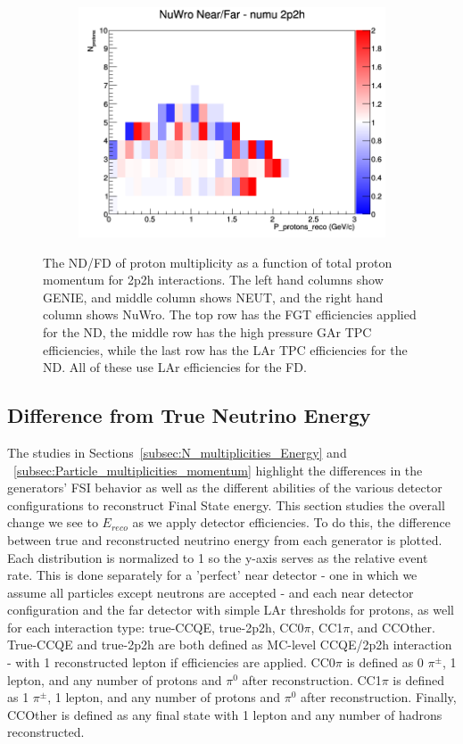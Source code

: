 \documentclass[12pt]{article}
\begin{document}
\begin{figure}[h]
\begin{subfigure}[b]{0.32\textwidth}
\includegraphics[width=\linewidth]{eff_N_P/LAr/protons/ratios/2p2h_NuWro_numu_NF_N_P.png}
\end{subfigure}
\caption{The ND/FD of proton multiplicity as a function of total proton momentum for 2p2h interactions. The left hand columns show GENIE, and middle column shows NEUT, and the right hand column shows NuWro. The top row has the FGT efficiencies applied for the ND, the middle row has the high pressure GAr TPC efficiencies, while the last row has the LAr TPC efficiencies for the ND.  All of these use LAr efficiencies for the FD.}
\label{fig:proton_multiplicity_2p2h_NF_eff}
\end{figure}



\subsection{Difference from True Neutrino Energy}
\label{subsec:EDiff}
The studies in Sections~\ref{subsec:N_multiplicities_Energy} and ~\ref{subsec:Particle_multiplicities_momentum} highlight the differences in the generators' FSI behavior as well as the different abilities of the various detector configurations to reconstruct Final State energy. This section studies the overall change we see to $E_{reco}$ as we apply detector efficiencies. To do this, the difference between true and reconstructed neutrino energy from each generator is plotted. Each distribution is normalized to 1 so the y-axis serves as the relative event rate. This is done separately for a 'perfect' near detector - one in which we assume all particles except neutrons are accepted - and each near detector configuration and the far detector with simple LAr thresholds for protons, as well for each interaction type: true-CCQE, true-2p2h, CC0$\pi$, CC1$\pi$, and CCOther. True-CCQE and true-2p2h are both defined as MC-level CCQE/2p2h interaction - with 1 reconstructed lepton if efficiencies are applied. CC0$\pi$ is defined as 0 $\pi^{\pm}$, 1 lepton, and any number of protons and $\pi^0$ after reconstruction. CC1$\pi$ is defined as 1 $\pi^{\pm}$, 1 lepton, and any number of protons and $\pi^0$ after reconstruction. Finally, CCOther is defined as any final state with 1 lepton and any number of hadrons reconstructed.
\end{document}
